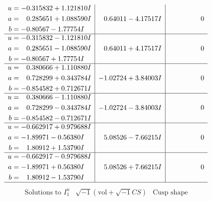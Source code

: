 \documentclass[1p]{elsarticle_modified}
\theoremstyle{definition}
\newcommand{\I}{\sqrt{-1}}
\begin{document}
$$\begin{array}{c|c|c}
\begin{aligned}
u &= -0.315832 + 1.121810 I \\
a &= \phantom{-}0.285651 + 1.088590 I \\
b &= -0.80567 - 1.77754 I\end{aligned}
 & \phantom{-}0.64011 - 4.17517 I & \phantom{-0.000000 } 0 \\ \hline\begin{aligned}
u &= -0.315832 - 1.121810 I \\
a &= \phantom{-}0.285651 - 1.088590 I \\
b &= -0.80567 + 1.77754 I\end{aligned}
 & \phantom{-}0.64011 + 4.17517 I & \phantom{-0.000000 } 0 \\ \hline\begin{aligned}
u &= \phantom{-}0.380666 + 1.110880 I \\
a &= \phantom{-}0.728299 + 0.343784 I \\
b &= -0.854582 + 0.712671 I\end{aligned}
 & -1.02724 + 3.84003 I & \phantom{-0.000000 } 0 \\ \hline\begin{aligned}
u &= \phantom{-}0.380666 - 1.110880 I \\
a &= \phantom{-}0.728299 - 0.343784 I \\
b &= -0.854582 - 0.712671 I\end{aligned}
 & -1.02724 - 3.84003 I & \phantom{-0.000000 } 0 \\ \hline\begin{aligned}
u &= -0.662917 + 0.979688 I \\
a &= -1.89971 - 0.56380 I \\
b &= \phantom{-}1.80912 + 1.53790 I\end{aligned}
 & \phantom{-}5.08526 - 7.66215 I & \phantom{-0.000000 } 0 \\ \hline\begin{aligned}
u &= -0.662917 - 0.979688 I \\
a &= -1.89971 + 0.56380 I \\
b &= \phantom{-}1.80912 - 1.53790 I\end{aligned}
 & \phantom{-}5.08526 + 7.66215 I & \phantom{-0.000000 } 0\\
 \hline 
 \end{array}$$\newpage$$\begin{array}{c|c|c}  
\text{Solutions to }I^u_{1}& \I (\text{vol} + \sqrt{-1}CS) & \text{Cusp shape}\\
 \hline 
\begin{aligned}

\end{aligned}
\end{array}$$
\end{document}
